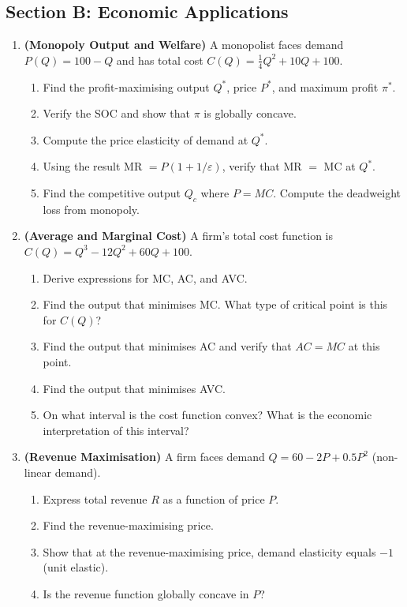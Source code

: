 \documentclass[12pt, a4paper]{article}
\theoremstyle{definition}
\begin{document}
\subsection{Section B: Economic Applications}

\begin{enumerate}[label=\textbf{B\arabic*.}, leftmargin=2.5em]

\item \textbf{(Monopoly Output and Welfare)}
A monopolist faces demand $P(Q) = 100 - Q$ and has total cost
$C(Q) = \frac{1}{4}Q^2 + 10Q + 100$.
\begin{enumerate}[label=(\alph*)]
  \item Find the profit-maximising output $Q^*$, price $P^*$, and
        maximum profit $\pi^*$.
  \item Verify the SOC and show that $\pi$ is globally concave.
  \item Compute the price elasticity of demand at $Q^*$.
  \item Using the result MR $= P(1+1/\varepsilon)$, verify that
        MR $=$ MC at $Q^*$.
  \item Find the competitive output $Q_c$ where $P = MC$.
        Compute the deadweight loss from monopoly.
\end{enumerate}

\item \textbf{(Average and Marginal Cost)}
A firm's total cost function is $C(Q) = Q^3 - 12Q^2 + 60Q + 100$.
\begin{enumerate}[label=(\alph*)]
  \item Derive expressions for MC, AC, and AVC.
  \item Find the output that minimises MC.  What type of critical point
        is this for $C(Q)$?
  \item Find the output that minimises AC and verify that $AC = MC$ at
        this point.
  \item Find the output that minimises AVC.
  \item On what interval is the cost function convex?  What is the
        economic interpretation of this interval?
\end{enumerate}

\item \textbf{(Revenue Maximisation)}
A firm faces demand $Q = 60 - 2P + 0.5P^2$ (non-linear demand).
\begin{enumerate}[label=(\alph*)]
  \item Express total revenue $R$ as a function of price $P$.
  \item Find the revenue-maximising price.
  \item Show that at the revenue-maximising price, demand elasticity
        equals $-1$ (unit elastic).
  \item Is the revenue function globally concave in $P$?
\end{enumerate}


\end{enumerate}
\end{document}
